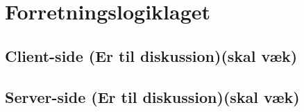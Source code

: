 \chapter{Forretningslogiklaget}

\section{Client-side (Er til diskussion)(skal væk)}

\section{Server-side (Er til diskussion)(skal væk)}

